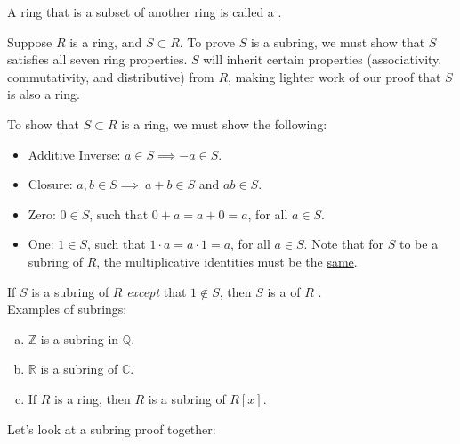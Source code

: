 \begin{defn}\label{subring}
A ring that is a subset of another ring is called a .
\end{defn}

Suppose $R$ is a ring, and $S\subset R$. To prove $S$ is a subring, we must show that $S$ satisfies all seven ring properties. $S$ will inherit certain properties (associativity, commutativity, and distributive) from $R$, making lighter work of our proof that $S$ is also a ring. 

To show that $S\subset R$ is a ring, we must show the following:

\begin{itemize}
\item Additive Inverse:  $a\in S\implies-a\in S$.
\item Closure:  $a,b\in S\implies~a+b\in S$ and $ab\in S$.
\item Zero: $0\in S$, such that $0+a=a+0=a$, for all $a\in S$.
\item One:  $1\in S$, such that $1\cdot a=a\cdot 1=a$, for all $a\in S$. Note that for $S$ to be a subring of $R$, the multiplicative identities must be the \underline{same}.
\end{itemize}

If $S$ is a subring of $R$ \emph{except} that $1\notin S$, then $S$ is a  of $R$ .\\

Examples of subrings:
\begin{enumerate}[(a)]
\item ${\mathbb Z}$ is a subring in ${\mathbb Q}$.
\item ${\mathbb R}$ is a subring of ${\mathbb C}$.
\item If $R$ is a ring, then $R$ is a subring of $R[x]$.
\end{enumerate}

Let's look at a subring proof together:

